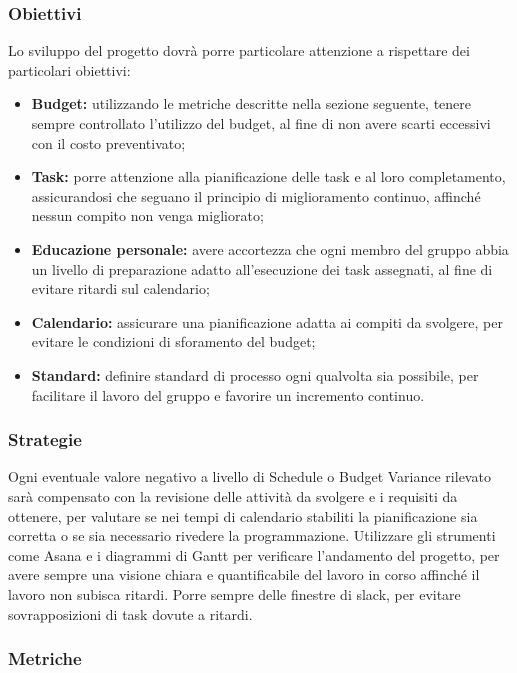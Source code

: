 \documentclass[PianoDiQualifica.tex]{subfiles}
\begin{document}
\subsubsection{Obiettivi}
Lo sviluppo del progetto dovrà porre particolare attenzione a rispettare dei particolari obiettivi:
\begin{itemize}
	\item \textbf{Budget:} utilizzando le metriche descritte nella sezione seguente, tenere sempre controllato l'utilizzo del budget, al fine di non avere scarti eccessivi con il costo preventivato;
	\item \textbf{Task:} porre attenzione alla pianificazione delle task e al loro completamento, assicurandosi che seguano il principio di miglioramento continuo, affinché nessun compito non venga migliorato;
	\item \textbf{Educazione personale:} avere accortezza che ogni membro del gruppo abbia un livello di preparazione adatto all'esecuzione dei task assegnati, al fine di evitare ritardi sul calendario;
	\item \textbf{Calendario:} assicurare una pianificazione adatta ai compiti da svolgere, per evitare le condizioni di sforamento del budget;
	\item \textbf{Standard:} definire standard di processo ogni qualvolta sia possibile, per facilitare il lavoro del gruppo e favorire un incremento continuo.
\end{itemize}

\subsubsection{Strategie}
Ogni eventuale valore negativo a livello di Schedule o Budget Variance rilevato sarà compensato con la revisione delle attività da svolgere e i requisiti da ottenere, per valutare se nei tempi di calendario stabiliti la pianificazione sia corretta o se sia necessario rivedere la programmazione.
Utilizzare gli strumenti come Asana e i diagrammi di Gantt per verificare l'andamento del progetto, per avere sempre una visione chiara e quantificabile del lavoro in corso affinché il lavoro non subisca ritardi.
Porre sempre delle finestre di slack, per evitare sovrapposizioni di task dovute a ritardi. 

\subsubsection{Metriche} 
\end{document}
